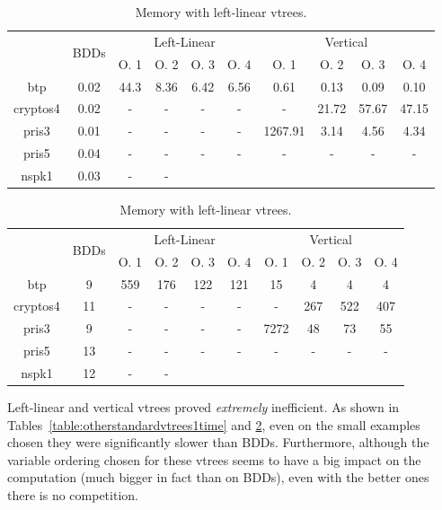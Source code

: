 \documentclass[11pt]{report}
\begin{document}
\begin{table}
\centering
\begin{tabular}{|*{10}{c|}}
\hline
\multirow{2}{*}{} & \multirow{2}{*}{BDDs} & \multicolumn{4}{c|}{Left-Linear} & \multicolumn{4}{c|}{Vertical}\\ \cline{3-10}
& & O. 1 & O. 2 & O. 3 & O. 4  & O. 1 & O. 2 & O. 3 & O. 4 \\ \hline
btp & 0.02& 44.3 & 8.36 & 6.42 & 6.56 & 0.61 & 0.13 & 0.09 & 0.10 \\ \hline
cryptos4 & 0.02 & - & - & - & - & - & 21.72 & 57.67 & 47.15 \\ \hline
pris3 & 0.01 & - & - & - & - & 1267.91 & 3.14 & 4.56 & 4.34 \\ \hline
pris5 & 0.04 &- &- &- &- & - &-  &- & -\\ \hline
nspk1 & 0.03 & - & - & & & & & & \\ \hline
\end{tabular}
\caption{Time Comparisons with left-linear vtrees.}
\label{table:otherstandardvtrees1time}
\vspace{0.5in}
\centering
\begin{tabular}{|*{10}{c|}}
\hline
\multirow{2}{*}{} & \multirow{2}{*}{BDDs} & \multicolumn{4}{c|}{Left-Linear} & \multicolumn{4}{c|}{Vertical}\\ \cline{3-10}
& & O. 1 & O. 2 & O. 3 & O. 4  & O. 1 & O. 2 & O. 3 & O. 4 \\ \hline
btp & 9 & 559 & 176 & 122 & 121 & 15 & 4 & 4 & 4 \\ \hline
cryptos4 & 11 & - & - & -& - & -  & 267 & 522 & 407 \\ \hline
pris3 & 9 & - & - & - & - & 7272 & 48 & 73 & 55 \\ \hline
pris5 & 13 & - &- &- &- &- &- &-&- \\ \hline
nspk1 & 12 & - &- & & & & & & \\ \hline
\end{tabular}
\caption{Memory with left-linear vtrees.}
\label{table:otherstandardvtrees1memory}
\end{table}

Left-linear and vertical vtrees proved \textit{extremely} inefficient. As shown in Tables~\ref{table:otherstandardvtrees1time} and \ref{table:otherstandardvtrees1memory}, even on the small examples chosen they were significantly slower than BDDs. Furthermore, although the variable ordering chosen for these vtrees seems to have a big impact on the computation (much bigger in fact than on BDDs), even with the better ones there is no competition.  
\end{document}
